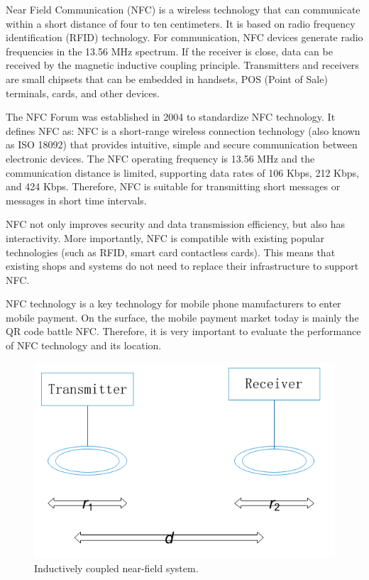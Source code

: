 \documentclass[journal]{IEEEtran}
\begin{document}
Near Field Communication (NFC) is a wireless technology that can communicate within a short distance of four to ten centimeters. It is based on radio frequency identification (RFID) technology. For communication, NFC devices generate radio frequencies in the 13.56 MHz spectrum. If the receiver is close, data can be received by the magnetic inductive coupling principle. Transmitters and receivers are small chipsets that can be embedded in handsets, POS (Point of Sale) terminals, cards, and other devices.


The NFC Forum was established in 2004 to standardize NFC technology. It defines NFC as: NFC is a short-range wireless connection technology (also known as ISO 18092) that provides intuitive, simple and secure communication between electronic devices. The NFC operating frequency is 13.56 MHz and the communication distance is limited, supporting data rates of 106 Kbps, 212 Kbps, and 424 Kbps. Therefore, NFC is suitable for transmitting short messages or messages in short time intervals.

NFC not only improves security and data transmission efficiency, but also has interactivity. More importantly, NFC is compatible with existing popular technologies (such as RFID, smart card contactless cards). This means that existing shops and systems do not need to replace their infrastructure to support NFC.

NFC technology is a key technology for mobile phone manufacturers to enter mobile payment. On the surface, the mobile payment market today is mainly the QR code battle NFC. Therefore, it is very important to evaluate the performance of NFC technology and its location.

\begin{figure}[htbp]
\centerline{\includegraphics[scale=0.45]{Inductively_couled_near-field.png}}
\caption{Inductively coupled near-field system.}
\label{fig}
\end{figure}
\end{document}
